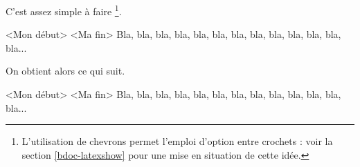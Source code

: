 C'est assez simple à faire
\footnote{
    L'utilisation de chevrons permet l'emploi d'option entre crochets : voir la section \ref{bdoc-latexshow} pour une mise en situation de cette idée.
}.

\begin{bdoclatex}[code]
\begin{bdocshowcase}<Mon début>%
                    <Ma fin>
    Bla, bla, bla, bla, bla, bla, bla, bla, bla, bla, bla, bla, bla...
\end{bdocshowcase}
\end{bdoclatex}

On obtient alors ce qui suit.

\medskip

\begin{bdocshowcase}<Mon début>%
                    <Ma fin>
    Bla, bla, bla, bla, bla, bla, bla, bla, bla, bla, bla, bla, bla...
\end{bdocshowcase}


